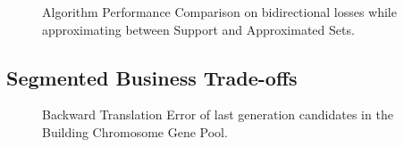 \begin{figure}%
    \centering
    \qquad
    \caption{ Algorithm Performance Comparison on bidirectional losses while approximating between Support and Approximated Sets.}
    \label{fig:baselineComp}%
\end{figure}


\subsection{Segmented Business Trade-offs }


\begin{figure}%
    \centering
    \qquad
    \caption{Backward Translation Error of last generation candidates in the Building Chromosome Gene Pool.}
    \label{fig:fwdbkwdVar}%
\end{figure}

